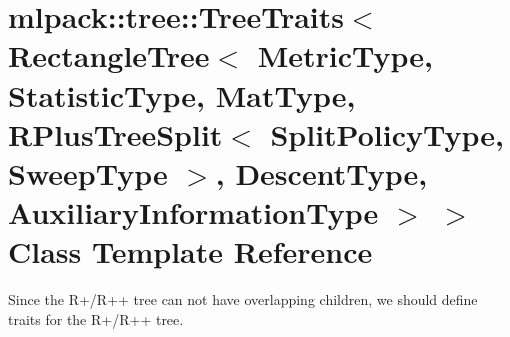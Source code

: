 \section{mlpack\+:\+:tree\+:\+:Tree\+Traits$<$ Rectangle\+Tree$<$ Metric\+Type, Statistic\+Type, Mat\+Type, R\+Plus\+Tree\+Split$<$ Split\+Policy\+Type, Sweep\+Type $>$, Descent\+Type, Auxiliary\+Information\+Type $>$ $>$ Class Template Reference}
\label{classmlpack_1_1tree_1_1TreeTraits_3_01RectangleTree_3_01MetricType_00_01StatisticType_00_01MatTyd3300c6b7e2f56d4c1027298545eb7bf}


Since the R+/\+R++ tree can not have overlapping children, we should define traits for the R+/\+R++ tree.  


